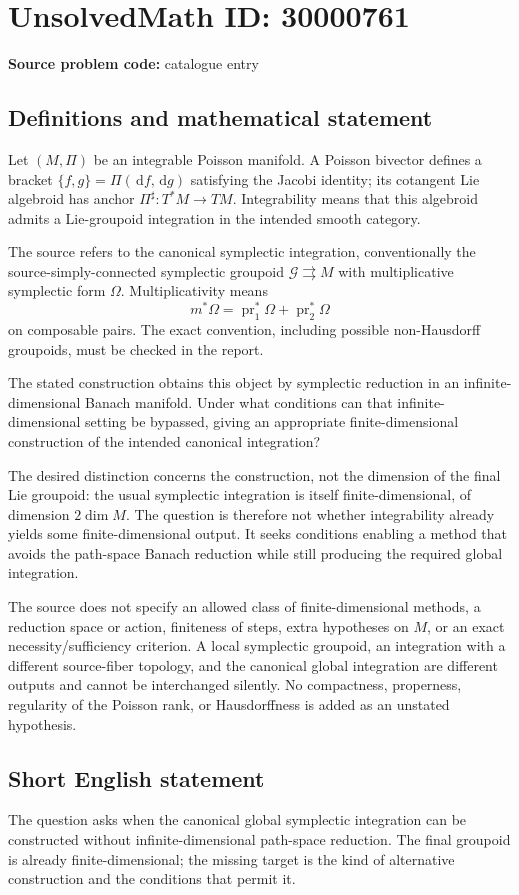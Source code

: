 \documentclass[11pt]{article}
\newcommand{\dd}{\,\mathrm{d}}
\begin{document}
\section*{UnsolvedMath ID: 30000761}
\textbf{Source problem code:} catalogue entry
\subsection{Definitions and mathematical statement}
Let $(M,\Pi)$ be an integrable Poisson manifold. A Poisson bivector defines a bracket $\{f,g\}=\Pi(\dd f,\dd g)$ satisfying the Jacobi identity; its cotangent Lie algebroid has anchor $\Pi^\sharp:T^*M\to TM$. Integrability means that this algebroid admits a Lie-groupoid integration in the intended smooth category.

The source refers to the canonical symplectic integration, conventionally the source-simply-connected symplectic groupoid $\mathcal G\rightrightarrows M$ with multiplicative symplectic form $\Omega$. Multiplicativity means
\[
 m^*\Omega=\operatorname{pr}_1^*\Omega+\operatorname{pr}_2^*\Omega
\]
on composable pairs. The exact convention, including possible non-Hausdorff groupoids, must be checked in the report.

The stated construction obtains this object by symplectic reduction in an infinite-dimensional Banach manifold. Under what conditions can that infinite-dimensional setting be bypassed, giving an appropriate finite-dimensional construction of the intended canonical integration?

The desired distinction concerns the construction, not the dimension of the final Lie groupoid: the usual symplectic integration is itself finite-dimensional, of dimension $2\dim M$. The question is therefore not whether integrability already yields some finite-dimensional output. It seeks conditions enabling a method that avoids the path-space Banach reduction while still producing the required global integration.

The source does not specify an allowed class of finite-dimensional methods, a reduction space or action, finiteness of steps, extra hypotheses on $M$, or an exact necessity/sufficiency criterion. A local symplectic groupoid, an integration with a different source-fiber topology, and the canonical global integration are different outputs and cannot be interchanged silently. No compactness, properness, regularity of the Poisson rank, or Hausdorffness is added as an unstated hypothesis.
\subsection{Short English statement}
The question asks when the canonical global symplectic integration can be constructed without infinite-dimensional path-space reduction. The final groupoid is already finite-dimensional; the missing target is the kind of alternative construction and the conditions that permit it.
\end{document}
